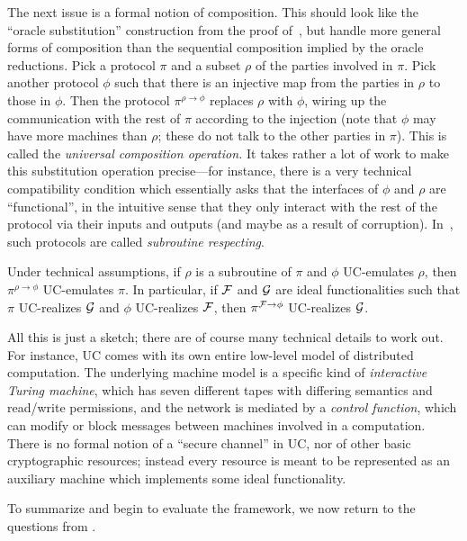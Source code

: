 The next issue is a formal notion of composition. This should look like the
``oracle substitution'' construction from the proof
of~,
but handle more general forms of composition than the sequential composition
implied by the oracle reductions. Pick a protocol $\pi$ and a subset $\rho$ of
the parties involved in $\pi$. Pick another protocol $\phi$ such that there is
an injective map from the parties in $\rho$ to those in $\phi$. Then the
protocol $\pi^{\rho\to\phi}$ replaces $\rho$ with $\phi$, wiring up the
communication with the rest of $\pi$ according to the injection (note that
$\phi$ may have more machines than $\rho$; these do not talk to the other
parties in $\pi$). This is called the \emph{universal composition operation.} It
takes rather a lot of work to make this substitution operation precise---for
instance, there is a very technical compatibility condition which essentially
asks that the interfaces of $\phi$ and $\rho$ are ``functional'', in the
intuitive sense that they only interact with the rest of the protocol via their
inputs and outputs (and maybe as a result of corruption).
In~\cite{canetti-2020}, such protocols are called \emph{subroutine respecting}.

\begin{thm}
  Under technical assumptions, if $\rho$ is a subroutine of $\pi$ and $\phi$
  UC-emulates $\rho$, then $\pi^{\rho\to\phi}$ UC-emulates $\pi$. In particular,
  if $\mathcal{F}$ and $\mathcal{G}$ are ideal functionalities such that $\pi$ UC-realizes
  $\mathcal{G}$ and $\phi$ UC-realizes $\mathcal{F}$, then $\pi^{\mathcal{F}\to\phi}$ UC-realizes $\mathcal{G}$.
\end{thm}

All this is just a sketch; there are of course many technical details to work
out. For instance, UC comes with its own entire low-level model of distributed
computation. The underlying machine model is a specific kind of
\emph{interactive Turing machine}, which has seven different tapes with
differing semantics and read/write permissions, and the network is mediated by a
\emph{control function}, which can modify or block messages between machines
involved in a computation. There is no formal notion of a ``secure channel'' in
UC, nor of other basic cryptographic resources; instead every resource is meant
to be represented as an auxiliary machine which implements some ideal
functionality.

To summarize and begin to evaluate the framework, we now return to the questions
from .

